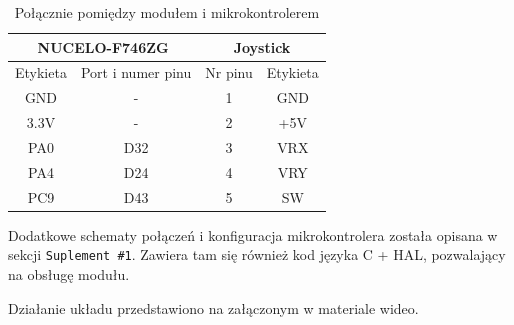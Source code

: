 \documentclass[11pt, a4paper]{article}
\begin{document}
\vspace{0.5cm}
\begin{table}[h!]
    \centering
    \begin{tabular}{|c|c|c|c|} 
        \hline
        \multicolumn{2}{|c|}{NUCELO-F746ZG} & \multicolumn{2}{c|}{Joystick}  \\ 
        \hline
        Etykieta & Port i numer pinu       & Nr pinu & Etykieta           \\ 
        \hline
        GND      & -                    & 1       & GND             
        \\
        \hline
        3.3V      & -                    & 2        & +5V          
        \\
        \hline
        PA0      & D32                      & 3       & VRX              \\
        \hline
        PA4      & D24                       & 4       & VRY              \\
        \hline
        PC9      & D43                       & 5       & SW              \\
        \hline
    \end{tabular}
    \caption{Połącznie pomiędzy modułem i mikrokontrolerem}
    \label{tab:tab1}
\end{table}

Dodatkowe schematy połączeń i konfiguracja
mikrokontrolera została opisana w sekcji \texttt{Suplement \#1}. Zawiera tam się również kod języka
C + HAL, pozwalający na obsługę modułu.

\vspace{0.5cm}
Działanie układu przedstawiono na załączonym w \texttt{\cite{yt1}} materiale wideo.

\newpage
\printbibliography[heading=bibintoc]
\end{document}
